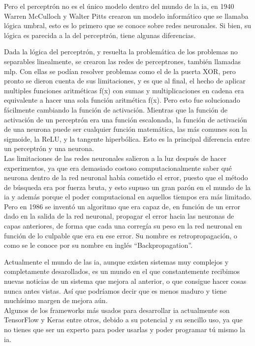 Pero el perceptrón no es el único modelo dentro del mundo de la \gls{ia}, en 1940 Warren McCulloch y Walter Pitts crearon un modelo informático que se llamaba lógica umbral, esto es lo primero que se conoce sobre redes neuronales. Si bien, su lógica es parecida a la del perceptrón, tiene algunas diferencias. 

Dada la lógica del perceptrón, y resuelta la problemática de los problemas no separables linealmente, se crearon las redes de perceptrones, también llamadas \gls{mlp}. Con ellas se podían resolver problemas como el de la puerta XOR, pero pronto se dieron cuenta de sus limitaciones, y es que al final, el hecho de aplicar multiples funciones aritméticas f(x) con sumas y multiplicaciones en cadena era equivalente a hacer una sola función aritmética f(x). Pero esto fue solucionado fácilmente cambiando la función de activación. Mientras que la función de activación de un perceptrón era una función escalonada, la función de activación de una neurona puede ser cualquier función matemática, las más comunes son la sigmoide, la ReLU, y la tangente hiperbólica. Esto es la principal diferencia entre un perceptrón y una neurona.
\\
Las limitaciones de las redes neuronales salieron a la luz después de hacer experimentos, ya que era demasiado costoso computacionalmente saber qué neurona dentro de la red neuronal había cometido el error, puesto que el método de búsqueda era por fuerza bruta, y esto supuso un gran parón en el mundo de la \gls{ia} y además porque el poder computacional en aquellos tiempos era más limitado.
\\
Pero en 1986 se inventó un algoritmo que era capaz de, en función de un error dado en la salida de la red neuronal, propagar el error hacia las neuronas de capas anteriores, de forma que cada una corregía su peso en la red neuronal en función de lo culpable que era en ese error. Su nombre es retropropagación, o como se le conoce por su nombre en inglés ``Backpropagation''. 

Actualmente el mundo de las \gls{ia}, aunque existen sistemas muy complejos y completamente desarollados, es un mundo en el que constantemente recibimos nuevas noticias de un sistema que mejora al anterior, o que consigue hacer cosas nunca antes vistas. Así que podríamos decir que es menos maduro y tiene muchísimo margen de mejora aún.
\\
Algunos de los frameworks más usados para desarrollar \gls{ia} actualmente son TensorFlow y Keras entre otros, debido a su potencial y su sencillo uso, ya que no tienes que ser un experto para poder usarlas y poder programar tú mismo la \gls{ia}.

